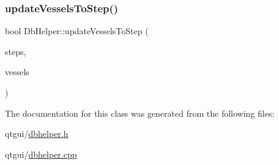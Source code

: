 \mbox{\label{class_db_helper_a9ac40eb29893a6e33fed981d490c037b}} 
\subsubsection{\texorpdfstring{updateVesselsToStep()}{updateVesselsToStep()}}
{\footnotesize\ttfamily bool Db\+Helper\+::update\+Vessels\+To\+Step (\begin{DoxyParamCaption}\item[{int}]{steps,  }\item[{Q\+List$<$ std\+::shared\+\_\+ptr$<$ \mbox{\hyperlink{class_vessel_data}{Vessel\+Data}} $>$ $>$ \&}]{vessels }\end{DoxyParamCaption})}



The documentation for this class was generated from the following files\+:\begin{DoxyCompactItemize}
\item 
qtgui/\mbox{\hyperlink{dbhelper_8h}{dbhelper.\+h}}\item 
qtgui/\mbox{\hyperlink{dbhelper_8cpp}{dbhelper.\+cpp}}\end{DoxyCompactItemize}
